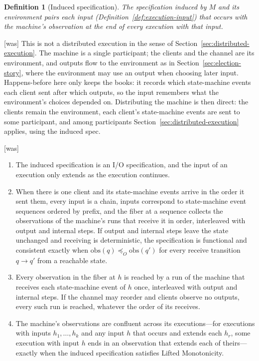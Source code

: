 \documentclass[sigconf]{cidr-2027}
\newtheorem{definition}{Definition}
\theoremstyle{remark}
\newcommand{\OutputOrd}{\preceq_O}
\newcommand{\outrel}{extends\xspace}          %
\newcommand{\spectype}[1][]{I/O specification#1\xspace}
\begin{document}
\begin{definition}[Induced specification]
\label{def:induced-specification}
The specification \emph{induced} by $M$ and its environment pairs each input
(Definition~\ref{def:execution-input}) that occurs with the machine's
observation at the end of every execution with that input.
\end{definition}



{\footnotesize\color{black!50}\noindent\textsf{[was]} This is not a distributed execution in the sense of
Section~\ref{sec:distributed-execution}.  The machine is a single
participant; the clients and the channel are its environment, and outputs
flow to the environment as in Section~\ref{sec:election-story}, where the
environment may use an output when choosing later input.  Happens-before here
only keeps the books: it records which state-machine events each client sent after which
outputs, so the input remembers what the environment's choices depended on.
Distributing the machine is then direct: the clients remain the environment,
each client's state-machine events are sent to some participant, and among participants
Section~\ref{sec:distributed-execution} applies, using the induced
spec.\par}



{\footnotesize\color{black!50}\noindent\textsf{[was]} \leavevmode
\begin{enumerate}
  \item The induced specification is an \spectype, and the input
        of an execution only extends as the execution continues.
  \item When there is one client and its state-machine events arrive in the order it sent
        them, every input is a chain, inputs correspond to state-machine event sequences
        ordered by prefix, and the fiber at a sequence collects the
        observations of the machine's runs that receive it in order,
        interleaved with output and internal steps.  If output and internal
        steps leave the state unchanged and receiving is deterministic, the
        specification is functional and consistent exactly when
        $\mathrm{obs}(q)\OutputOrd\mathrm{obs}(q')$ for every receive
        transition $q\to q'$ from a reachable state.
  \item Every observation in the fiber at $h$ is reached by a run of the
        machine that receives each state-machine event of $h$ once, interleaved with output
        and internal steps.  If the channel may reorder and clients observe no
        outputs, every such run is reached, whatever the order of its
        receives.
  \item The machine's observations are confluent across its executions---for
        executions with inputs $h_1,\ldots,h_k$ and any input $h$ that occurs
        and extends each $h_r$, some execution with input $h$ ends in an
        observation that \outrel each of theirs---exactly when the induced
        specification satisfies Lifted Monotonicity.
\end{enumerate}\par}
\end{document}
